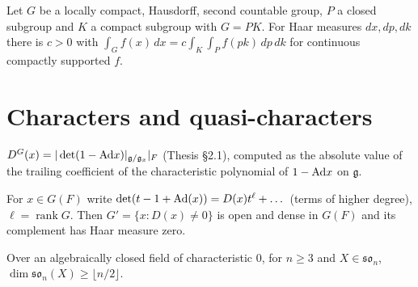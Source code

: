 \begin{literature}[Integration over $G=PK$]
\label{LIT-integral_eq_mul_integral_compact_integral}
\leanok
Let $G$ be a locally compact, Hausdorff, second countable group, $P$ a closed subgroup and $K$ a compact
subgroup with $G=PK$. For Haar measures $dx,dp,dk$ there is $c>0$ with
$\int_G f(x)\,dx = c\int_K\int_P f(pk)\,dp\,dk$ for continuous compactly supported $f$.

\end{literature}

\section{Characters and quasi-characters}
\begin{definition}
\label{weylDisc}
\leanok
$D^G(x)=|\det(1-\mathrm{Ad} x)|_{\mathfrak g/\mathfrak g_x}|_F$ (Thesis \S2.1), computed as the absolute value of the
trailing coefficient of the characteristic polynomial of $1-\mathrm{Ad} x$ on $\mathfrak g$.
\end{definition}

\begin{literature}
\label{LIT-hc_regular_open_dense_conull}
\leanok
{}
For $x\in G(F)$ write $\det(t-1+\mathrm{Ad}(x))=D(x)t^\ell+\dots$ (terms of higher degree), $\ell=\operatorname{rank}G$. Then $G'=\{x: D(x)\neq0\}$ is open and dense in $G(F)$ and its complement has Haar measure zero.

\end{literature}

\begin{literature}
\label{LIT-jantzen_finrank_soCentMat_ge}
\leanok
Over an algebraically closed field of characteristic $0$, for $n\ge3$ and $X\in\mathfrak{so}_n$, $\dim\mathfrak{so}_n(X)\ge\lfloor n/2\rfloor$.

\end{literature}

